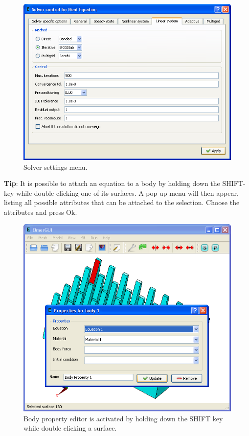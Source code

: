 \documentclass[a4paper,12pt]{article}
\begin{document}
\begin{figure}[ht]
\begin{center}
 \includegraphics[scale=0.5]{images/solversettings.png}
\caption{Solver settings menu.}
\end{center}
\end{figure}

{\bf Tip}: It is possible to attach an equation to a body by holding down the SHIFT-key
while double clicking one of its surfaces. A pop up menu will then appear,
listing all possible attributes that can be attached to the selection. Choose the
attributes and press Ok.

\begin{figure}[ht]
\begin{center}
 \includegraphics[scale=0.5]{images/bodyproperties.png}
\caption{Body property editor is activated by holding down the SHIFT key while double
clicking a surface.}
\end{center}
\end{figure}
\end{document}
